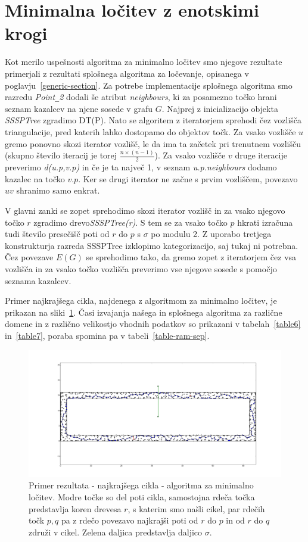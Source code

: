 \documentclass[a4paper, 12pt]{book}
\newcommand{\U}{\texttt{\_}}
\begin{document}
\section{Minimalna ločitev z enotskimi krogi}
Kot merilo uspešnosti algoritma za minimalno ločitev smo njegove rezultate primerjali z rezultati splošnega algoritma za ločevanje, opisanega v poglavju~\ref{generic-section}. Za potrebe implementacije splošnega algoritma smo razredu \textit{Point\U 2} dodali še atribut \textit{neighbours}, ki za posamezno točko hrani seznam kazalcev na njene sosede v grafu $G$. Najprej z inicializacijo objekta \textit{SSSP\-Tree} zgradimo DT(P). Nato se algoritem z iteratorjem sprehodi čez vozlišča triangulacije, pred katerih lahko dostopamo do objektov točk. Za vsako vozlišče $u$ gremo ponovno skozi iterator vozlišč, le da ima ta začetek pri trenutnem vozlišču (skupno število iteracij je torej $\frac{n\times (n-1)}{2}$). Za vsako vozlišče $v$ druge iteracije preverimo \textit{d(u.p,v.p)} in če je ta največ 1, v seznam \textit{u.p.neighbours} dodamo kazalec na točko $v.p$. Ker se drugi iterator ne začne s prvim vozliščem, povezavo $uv$ shranimo samo enkrat.

V glavni zanki se zopet sprehodimo skozi iterator vozlišč in za vsako njegovo točko $r$ zgradimo drevo\textit{SSSP\-Tree(r)}. S tem se za vsako točko $p$ hkrati izračuna tudi število presečišč poti od $r$ do $p$ s $\sigma$ po modulu 2. Z uporabo tretjega konstrukturja razreda SSSPTree izklopimo kategorizacijo, saj tukaj ni potrebna. Čez povezave $E(G)$ se sprehodimo tako, da gremo zopet z iteratorjem čez vsa vozlišča in za vsako točko vozlišča preverimo vse njegove sosede s pomočjo seznama kazalcev.  

Primer najkrajšega cikla, najdenega z algoritmom za minimalno ločitev, je prikazan na sliki~\ref{sep-64-1-1000-narrow}. Časi izvajanja našega in splošnega algoritma za različne domene in z različno velikostjo vhodnih podatkov so prikazani v tabelah~\ref{table6} in~\ref{table7}, poraba spomina pa v tabeli~\ref{table-ram-sep}.

\begin{figure}[htp]
\centerline{\includegraphics[scale=0.3]{pics/separation-64-1-1000-narrow-2.png}}
\caption{Primer rezultata - najkrajšega cikla - algoritma za minimalno ločitev. Modre točke so del poti cikla, samostojna rdeča točka predstavlja koren drevesa $r$, s katerim smo našli cikel, par rdečih točk $p,q$ pa z rdečo povezavo najkrajši poti od $r$ do $p$ in od $r$ do $q$ združi v cikel. Zelena daljica predstavlja daljico $\sigma$.}
\label{sep-64-1-1000-narrow}
\end{figure}
\end{document}
